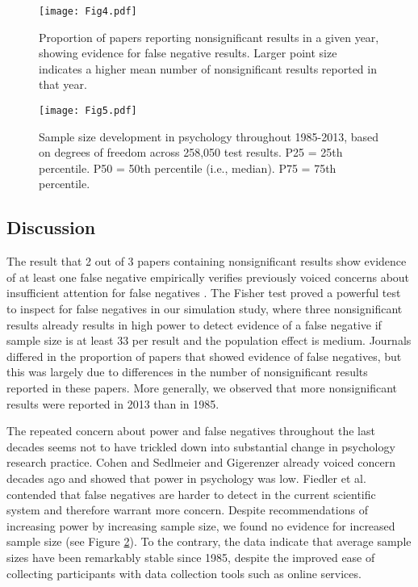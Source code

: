 \documentclass{article}
\begin{document}
\begin{figure}
\begin{center}
\texttt{[image: Fig4.pdf]}
\end{center}
\caption{Proportion of papers reporting nonsignificant results in a given year, showing evidence for false negative results. Larger point size indicates a higher mean number of nonsignificant results reported in that year.}
\label{fig:fig4}
\end{figure}

\begin{figure}
\begin{center}
\texttt{[image: Fig5.pdf]}
\end{center}
\caption{Sample size development in psychology throughout 1985-2013, based on degrees of freedom across 258,050 test results. P25 = 25th percentile. P50 = 50th percentile (i.e., median). P75 = 75th percentile.}
\label{fig:fig5}
\end{figure}

\subsection*{Discussion}

The result that 2 out of 3 papers containing nonsignificant results show evidence of at least one false negative empirically verifies previously voiced concerns about insufficient attention for false negatives \cite{Fiedler2012-gx}. The Fisher test proved a powerful test to inspect for false negatives in our simulation study, where three nonsignificant results already results in high power to detect evidence of a false negative if sample size is at least 33 per result and the population effect is medium. Journals differed in the proportion of papers that showed evidence of false negatives, but this was largely due to differences in the number of nonsignificant results reported in these papers. More generally, we observed that more nonsignificant results were reported in 2013 than in 1985. 

The repeated concern about power and false negatives throughout the last decades seems not to have trickled down into substantial change in psychology research practice. Cohen \cite{Cohen1962-jc} and Sedlmeier and Gigerenzer \cite{Sedlmeier1989-yc} already voiced concern decades ago and showed that power in psychology was low. Fiedler et al. \cite{Fiedler2012-gx} contended that false negatives are harder to detect in the current scientific system and therefore warrant more concern. Despite recommendations of increasing power by increasing sample size, we found no evidence for increased sample size (see Figure \ref{fig:fig5}). To the contrary, the data indicate that average sample sizes have been remarkably stable since 1985, despite the improved ease of collecting participants with data collection tools such as online services.
\end{document}
